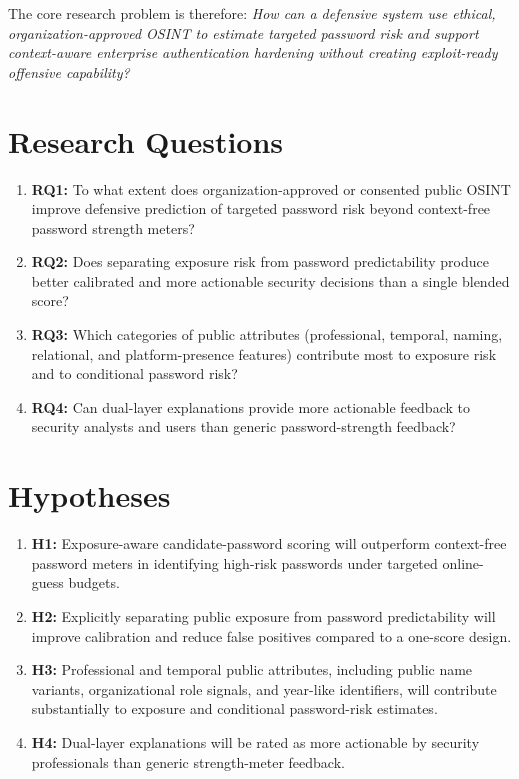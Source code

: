 \documentclass[11pt]{article}
\begin{document}
The core research problem is therefore: \emph{How can a defensive system use ethical, organization-approved OSINT to estimate targeted password risk and support context-aware enterprise authentication hardening without creating exploit-ready offensive capability?}

\section{Research Questions}
\begin{enumerate}[leftmargin=*]
  \item \textbf{RQ1:} To what extent does organization-approved or consented public OSINT improve defensive prediction of targeted password risk beyond context-free password strength meters?
  \item \textbf{RQ2:} Does separating exposure risk from password predictability produce better calibrated and more actionable security decisions than a single blended score?
  \item \textbf{RQ3:} Which categories of public attributes (professional, temporal, naming, relational, and platform-presence features) contribute most to exposure risk and to conditional password risk?
  \item \textbf{RQ4:} Can dual-layer explanations provide more actionable feedback to security analysts and users than generic password-strength feedback?
\end{enumerate}

\section{Hypotheses}
\begin{enumerate}[leftmargin=*]
  \item \textbf{H1:} Exposure-aware candidate-password scoring will outperform context-free password meters in identifying high-risk passwords under targeted online-guess budgets.
  \item \textbf{H2:} Explicitly separating public exposure from password predictability will improve calibration and reduce false positives compared to a one-score design.
  \item \textbf{H3:} Professional and temporal public attributes, including public name variants, organizational role signals, and year-like identifiers, will contribute substantially to exposure and conditional password-risk estimates.
  \item \textbf{H4:} Dual-layer explanations will be rated as more actionable by security professionals than generic strength-meter feedback.
\end{enumerate}
\end{document}
